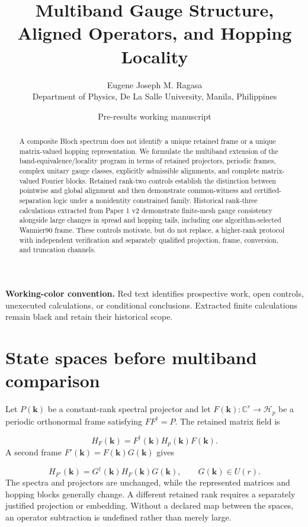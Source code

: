 \documentclass[11pt]{article}
\title{\textbf{Multiband Gauge Structure, Aligned Operators, and Hopping Locality}}
\author{Eugene Joseph M. Ragasa\\Department of Physics, De La Salle University, Manila, Philippines}
\date{Pre-results working manuscript}
\newenvironment{prospective}{\color{prospectivered}}{}
\begin{document}
\maketitle

\begin{prospective}
\noindent\textbf{Working-color convention.} Red text identifies prospective work,
open controls, unexecuted calculations, or conditional conclusions. Extracted finite
calculations remain black and retain their historical scope.
\end{prospective}

\begin{abstract}
A composite Bloch spectrum does not identify a unique retained frame or a unique
matrix-valued hopping representation. We formulate the multiband extension of the
band-equivalence/locality program in terms of retained projectors, periodic frames,
complex unitary gauge classes, explicitly admissible alignments, and complete
matrix-valued Fourier blocks. Retained rank-two controls establish the distinction
between pointwise and global alignment and then demonstrate common-witness and
certified-separation logic under a nonidentity constrained family. Historical rank-three
calculations extracted
from Paper 1 v2 demonstrate finite-mesh
gauge consistency alongside large changes in spread and hopping tails, including one
algorithm-selected Wannier90 frame. These controls
motivate, but do not replace, a higher-rank protocol with independent verification and
separately qualified projection, frame, conversion, and truncation channels.
\end{abstract}

\section{State spaces before multiband comparison}
Let $P(\mathbf k)$ be a constant-rank spectral projector and let $F(\mathbf k):\mathbb C^r\to\mathcal H_p$ be a periodic orthonormal frame satisfying $F F^\dagger=P$. The retained matrix field is

\begin{equation}
H_F(\mathbf k)=F^\dagger(\mathbf k)H_p(\mathbf k)F(\mathbf k).
\end{equation}
A second frame $F'(\mathbf k)=F(\mathbf k)G(\mathbf k)$ gives

\begin{equation}
H_{F'}(\mathbf k)=G^\dagger(\mathbf k)H_F(\mathbf k)G(\mathbf k),
\qquad G(\mathbf k)\in U(r).
\end{equation}
The spectra and projectors are unchanged, while the represented matrices and hopping blocks generally change. A different retained rank requires a separately justified projection or embedding. Without a declared map between the spaces, an operator subtraction is undefined rather than merely large.
\end{document}
